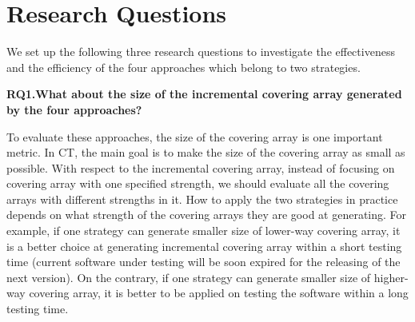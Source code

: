 \documentclass[conference]{IEEEtran}
\theoremstyle{definition}
\begin{document}






\section{Research Questions}
We set up the following three research questions to investigate the effectiveness and the efficiency of the four approaches which belong to two strategies.

\textbf{RQ1.What about the size of the incremental covering array generated by the four approaches?}

To evaluate these approaches, the size of the covering array is one important metric. In CT, the main goal is to make the size of the covering array as small as possible. With respect to the incremental covering array, instead of focusing on covering array with one specified strength, we should evaluate all the covering arrays with different strengths in it. How to apply the two strategies in practice depends on what strength of the covering arrays they are good at generating. For example, if one strategy can generate smaller size of lower-way covering array, it is a better choice at generating incremental covering array within a short testing time (current software under testing will be soon expired for the releasing of the next version). On the contrary, if one strategy can generate smaller size of higher-way covering array, it is better to be applied on testing the software within a long testing time.
\end{document}
